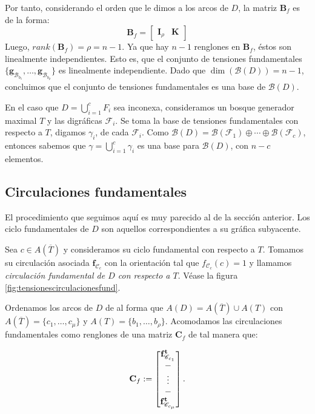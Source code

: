 Por tanto, considerando el orden que le dimos a los arcos de $D$, la matriz $\mathbf{B}_{f}$ es de la forma:
$$
\mathbf{B}_{f} = \begin{bmatrix}
\mathbf{I}_{\rho} & \mathbf{K} 
\end{bmatrix}
$$
Luego, $rank(\mathbf{B}_{f}) = \rho = n-1$. Ya que hay $n -1$ renglones en $\mathbf{B}_{f}$, éstos son linealmente independientes. Esto es, que el conjunto de tensiones fundamentales  $\{\mathbf{g}_{\mathscr{B}_{b_{1}}}, \ldots, \mathbf{g}_{\mathscr{B}_{b_{\rho}}} \}$ es linealmente independiente. Dado que $\dim(\mathcal{B}(D)) = n -1$, concluimos que el conjunto de tensiones fundamentales es una base de $\mathcal{B}(D)$.

En el caso que $D = \bigcup_{i = 1}^{c} F_{i}$ sea inconexa, consideramos  un bosque generador maximal $T$ y las digráficas $\mathcal{F}_{i}$. Se toma la base de tensiones fundamentales con respecto a $T$, digamos $\gamma_{i}$, de cada $\mathcal{F}_{i}$. Como $\mathcal{B}(D) = \mathcal{B}(\mathcal{F}_{1}) \oplus \cdots \oplus \mathcal{B}(\mathcal{F}_{c})$, entonces sabemos que $\gamma = \bigcup_{i =1}^{c}\gamma_{i}$ es una base para $\mathcal{B}(D)$, con $n - c$ elementos.


\subsection{Circulaciones fundamentales}
El procedimiento que seguimos aquí es muy parecido al de la sección anterior. Los ciclo fundamentales de $D$ son aquellos correspondientes a su gráfica subyacente. 

Sea $c \in A(\overline{T})$ y consideramos su ciclo fundamental con respecto a $T$.  Tomamos su circulación asociada $\mathbf{f}_{\mathscr{C}_{c}}$ con la orientación tal que $f_{\mathscr{C}_{c}}(c)=1$ y llamamos \textit{circulación fundamental de $D$ con respecto a $T$}. Véase la figura \ref{fig:tensionescirculacionesfund}.

Ordenamos los arcos de $D$ de al forma que $A(D) = A(\overline{T}) \cup A(T) $ con $A(\overline{T}) = \{c_{1}, \ldots, c_{\mu}\}$ y $A(T) = \{b_{1}, \ldots, b_{\rho}\}$. Acomodamos las circulaciones fundamentales como renglones de una matriz $\mathbf{C}_{f}$ de tal manera que:

$$
\mathbf{C}_{f} := \begin{bmatrix}
\mathbf{f}_{\mathscr{C}_{c_{1}}}^{\mathbf{t}} \\
\-- \\
\vdots \\
\-- \\
\mathbf{f}_{\mathscr{C}_{c_{\mu}}}^{\mathbf{t}}
\end{bmatrix}.
$$

